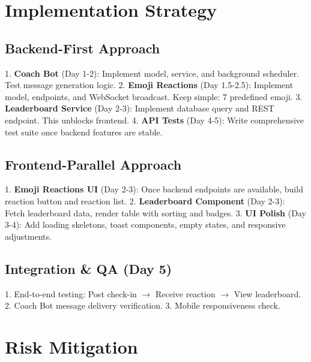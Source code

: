 \documentclass[11pt]{article}
\begin{document}
\section{Implementation Strategy}

\subsection{Backend-First Approach}

1. \textbf{Coach Bot} (Day 1-2): Implement model, service, and background scheduler. Test message generation logic.
2. \textbf{Emoji Reactions} (Day 1.5-2.5): Implement model, endpoints, and WebSocket broadcast. Keep simple: 7 predefined emoji.
3. \textbf{Leaderboard Service} (Day 2-3): Implement database query and REST endpoint. This unblocks frontend.
4. \textbf{API Tests} (Day 4-5): Write comprehensive test suite once backend features are stable.

\subsection{Frontend-Parallel Approach}

1. \textbf{Emoji Reactions UI} (Day 2-3): Once backend endpoints are available, build reaction button and reaction list.
2. \textbf{Leaderboard Component} (Day 2-3): Fetch leaderboard data, render table with sorting and badges.
3. \textbf{UI Polish} (Day 3-4): Add loading skeletons, toast components, empty states, and responsive adjustments.

\subsection{Integration \& QA (Day 5)}

1. End-to-end testing: Post check-in $\rightarrow$ Receive reaction $\rightarrow$ View leaderboard.
2. Coach Bot message delivery verification.
3. Mobile responsiveness check.

\section{Risk Mitigation}
\end{document}
